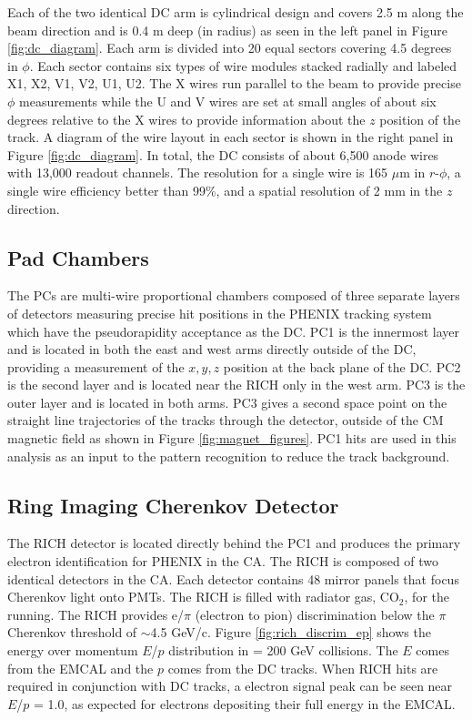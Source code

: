 Each of the two identical DC arm is cylindrical design and covers 2.5 m along the beam direction and is 0.4 m deep (in radius) as seen in the left panel in Figure \ref{fig:dc_diagram}. Each arm is divided into 20 equal sectors covering 4.5 degrees in $\phi$. Each sector contains six types of wire modules stacked radially and labeled X1, X2, V1, V2, U1, U2. The X wires run parallel to the beam to provide precise $\phi$ measurements while the U and V wires are set at small angles of about six degrees relative to the X wires to provide information about the $z$ position of the track. A diagram of the wire layout in each sector is shown in the right panel in Figure \ref{fig:dc_diagram}. In total, the DC consists of about 6,500 anode wires with 13,000 readout channels. The  resolution for a single wire is 165 $\mu$m in $r$-$\phi$, a single wire efficiency better than 99\%, and a spatial resolution of  2 mm in the $z$ direction.

\subsection{Pad Chambers}
The PCs are multi-wire proportional chambers composed of three separate layers of detectors measuring precise hit positions in the PHENIX tracking system which have the pseudorapidity acceptance as the DC. PC1 is the innermost layer and is located in both the east and west arms directly outside of the DC, providing a measurement of the $x, y, z$ position at the back plane of the DC. PC2 is the second layer and is located near the RICH only in the west arm. PC3 is the outer layer and is located in both arms. PC3 gives a second space point on the straight line trajectories of the tracks through the detector, outside of the CM magnetic field as shown in Figure \ref{fig:magnet_figures}. PC1 hits are used in this analysis as an input to the pattern recognition to reduce the track background.

\subsection{Ring Imaging Cherenkov Detector}
The RICH detector is located directly behind the PC1 and produces the primary electron identification for PHENIX in the CA. The RICH is composed of two identical detectors in the CA. Each detector contains 48 mirror panels that focus Cherenkov light onto PMTs. The RICH is filled with radiator gas, CO$_2$, for the \pau running. The RICH provides e/$\pi$ (electron to pion) discrimination below the $\pi$ Cherenkov threshold of $\sim$4.5 GeV/c. Figure \ref{fig:rich_discrim_ep} shows the energy over momentum $E$/$p$ distribution in \auau \sqsn = 200 GeV collisions. The $E$ comes from the EMCAL and the $p$ comes from the DC tracks. When RICH hits are required in conjunction with DC tracks, a electron signal peak can be seen near $E$/$p$ = 1.0, as expected for electrons depositing their full energy in the EMCAL.

